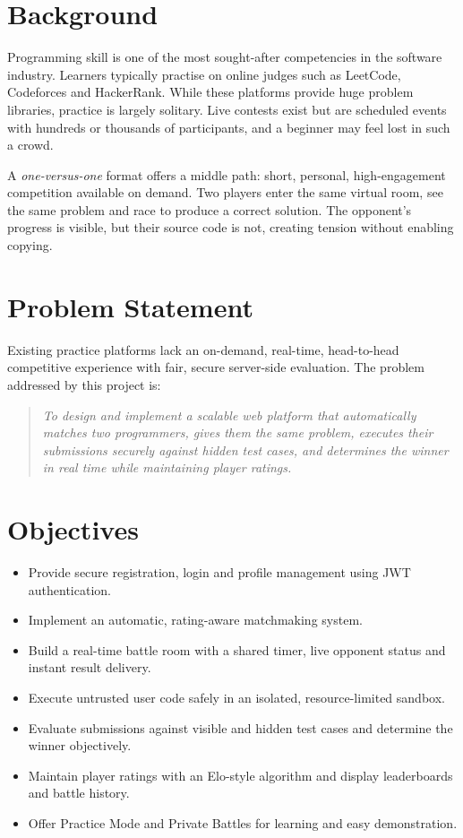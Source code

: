 \documentclass[12pt,a4paper,oneside]{report}
\begin{document}
\section{Background}
Programming skill is one of the most sought-after competencies in the software industry. Learners typically
practise on online judges such as LeetCode, Codeforces and HackerRank. While these platforms provide huge
problem libraries, practice is largely solitary. Live contests exist but are scheduled events with hundreds
or thousands of participants, and a beginner may feel lost in such a crowd.

A \emph{one-versus-one} format offers a middle path: short, personal, high-engagement competition available
on demand. Two players enter the same virtual room, see the same problem and race to produce a correct
solution. The opponent's progress is visible, but their source code is not, creating tension without
enabling copying.

\section{Problem Statement}
Existing practice platforms lack an on-demand, real-time, head-to-head competitive experience with fair,
secure server-side evaluation. The problem addressed by this project is:

\begin{quote}
\emph{To design and implement a scalable web platform that automatically matches two programmers, gives them
the same problem, executes their submissions securely against hidden test cases, and determines the winner
in real time while maintaining player ratings.}
\end{quote}

\section{Objectives}
\begin{itemize}[leftmargin=*]
  \item Provide secure registration, login and profile management using JWT authentication.
  \item Implement an automatic, rating-aware matchmaking system.
  \item Build a real-time battle room with a shared timer, live opponent status and instant result delivery.
  \item Execute untrusted user code safely in an isolated, resource-limited sandbox.
  \item Evaluate submissions against visible and hidden test cases and determine the winner objectively.
  \item Maintain player ratings with an Elo-style algorithm and display leaderboards and battle history.
  \item Offer Practice Mode and Private Battles for learning and easy demonstration.
\end{itemize}
\end{document}
